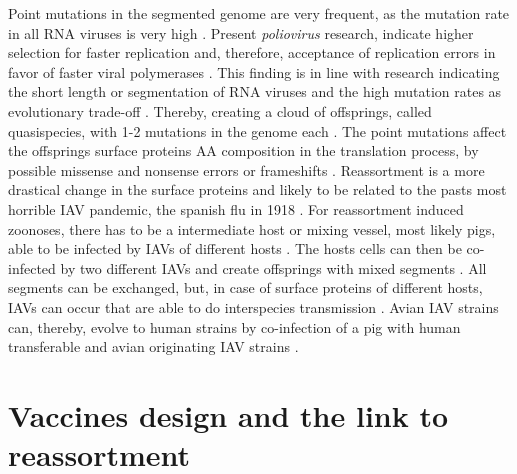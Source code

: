 \vspace{1em}

Point mutations in the segmented genome are very frequent, as the mutation rate in all RNA viruses is very high \autocite{duffy_why_2018}. Present \textit{poliovirus} research, indicate higher selection for faster replication and, therefore, acceptance of replication errors in favor of faster viral polymerases \autocite{pfeiffer_increased_2005, duffy_why_2018}. This finding is in line with research indicating the short length or segmentation of RNA viruses and the high mutation rates as evolutionary trade-off \autocite{belshaw_pacing_2008, vignuzzi_closing_2012}. Thereby, creating a cloud of offsprings, called quasispecies, with 1-2 mutations in the genome each \autocite{belshaw_pacing_2008, vignuzzi_closing_2012}. The point mutations affect the offsprings surface proteins \gls{AA} composition in the translation process, by possible missense and nonsense errors or frameshifts \autocite{parker_errors_1989, webster_chapter_1999}. Reassortment is a more drastical change in the surface proteins and likely to be related to the pasts most horrible \gls{IAV} pandemic, the spanish flu in 1918 \autocite{nelson_multiple_2008}. For reassortment induced zoonoses, there has to be a intermediate host or \glqq mixing vessel\grqq{}, most likely pigs, able to be infected by \glspl{IAV} of different hosts \autocite{shu_evidence_1994}. The hosts cells can then be co-infected by two different \glspl{IAV} and create offsprings with mixed segments \autocite{compans_influenza_2014}. All segments can be exchanged, but, in case of surface proteins of different hosts, \glspl{IAV} can occur that are able to do interspecies transmission \autocite{shu_evidence_1994}. Avian \gls{IAV} strains can, thereby, evolve to human strains by co-infection of a pig with human transferable and avian originating \gls{IAV} strains \autocite{shu_evidence_1994}. 

\section{Vaccines design and the link to reassortment}

